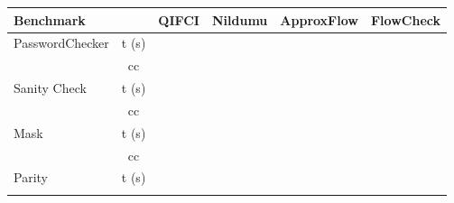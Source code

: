     \begin{center}
\begin{table}[]
    \begin{tabular}{@{}|l|c|l|l|l|l|l|l|@{}}
    \toprule
    \textbf{Benchmark}               & \multicolumn{1}{l|}{}      & \multicolumn{1}{c|}{\textbf{QIFCI}} & \multicolumn{2}{c|}{\textbf{Nildumu}} & \multicolumn{1}{c|}{\textbf{ApproxFlow}} & \multicolumn{2}{c|}{\textbf{FlowCheck}} \\ \midrule
    \multirow{2}{*}{PasswordChecker} & \multicolumn{1}{l|}{t (s)} &                                     & \multicolumn{2}{l|}{}                 &                                          & \multicolumn{2}{l|}{}                   \\ \cmidrule(l){2-8} 
                                     & cc                         &                                     & \multicolumn{2}{l|}{}                 &                                          & \multicolumn{2}{l|}{}                   \\ \midrule
    \multirow{2}{*}{Sanity Check}    & \multicolumn{1}{l|}{t (s)} &                                     & \multicolumn{2}{l|}{}                 &                                          & \multicolumn{2}{l|}{}                   \\ \cmidrule(l){2-8} 
                                     & cc                         &                                     & \multicolumn{2}{l|}{}                 &                                          & \multicolumn{2}{l|}{}                   \\ \midrule
    \multirow{2}{*}{Mask}            & t (s)                      &                                     & \multicolumn{2}{l|}{}                 &                                          & \multicolumn{2}{l|}{}                   \\ \cmidrule(l){2-8} 
                                     & cc                         &                                     & \multicolumn{2}{l|}{}                 &                                          & \multicolumn{2}{l|}{}                   \\ \midrule
    \multirow{2}{*}{Parity}          & t (s)                      &                                     & \multicolumn{2}{l|}{}                 &                                          & \multicolumn{2}{l|}{}                   \\ \cmidrule(l){2-8} 

\end{tabular}
\end{table}
\end{center}
